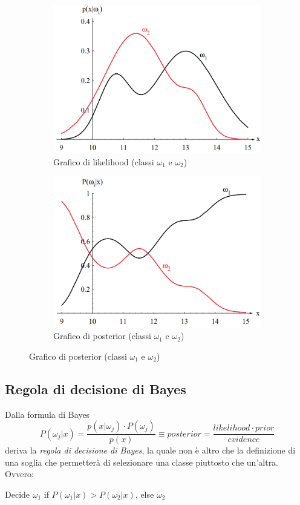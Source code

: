 \documentclass[a4paper,oneside,titlepage]{book}
\begin{document}
\begin{figure}[htp]
	\begin{subfigure}{0.49\textwidth}
	    \centering
		\includegraphics[width=\textwidth, height=\textheight, keepaspectratio]{likelihood.png}
		\caption{Grafico di likelihood (classi $\omega_1$ e $\omega_2$)}
	\end{subfigure}
	\hfill
	\begin{subfigure}{0.49\textwidth}
	    \centering
		\includegraphics[width=\textwidth, height=\textheight, keepaspectratio]{posterior.png}
		\caption{Grafico di posterior (classi $\omega_1$ e $\omega_2$)}
	\end{subfigure}
\end{figure}

\subsection{Regola di decisione di Bayes}
Dalla formula di Bayes
\[ P(\omega_j|x) = \frac{p(x|\omega_j) \cdot P(\omega_j)}{p(x)} \equiv posterior = \frac{likelihood \cdot prior}{evidence} \]
deriva la \textit{regola di decisione di Bayes}, la quale non è altro che la definizione di una soglia che permetterà di selezionare una classe piuttosto che un'altra. Ovvero:
\begin{center}
    Decide $\omega_1$ if $P(\omega_1|x) > P(\omega_2|x)$, else $\omega_2$
\end{center}
\end{document}
